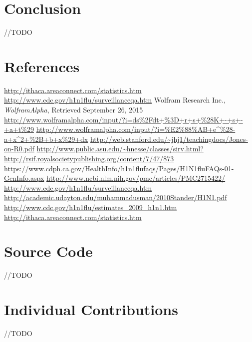 \documentclass[titlepage]{article}
\begin{document}
\section{Conclusion}
	//TODO
\section{References}
	\begin{thebibliography}{9}
		\url{http://ithaca.areaconnect.com/statistics.htm}
		\url{http://www.cdc.gov/h1n1flu/surveillanceqa.htm}
		Wolfram Research Inc.,
		\emph{WolframAlpha},
		Retrieved September 26, 2015
		\url{http://www.wolframalpha.com/input/?i=ds%2Fdt+%3D+r+s+%28K+-+s+-+a+t%29}
		\url{http://www.wolframalpha.com/input/?i=%E2%88%AB+e^%28-a+x^2+%2B+b+x%29+dx}
		\url{http://web.stanford.edu/~jhj1/teachingdocs/Jones-on-R0.pdf}
		\url{http://www.public.asu.edu/~hnesse/classes/sirv.html?}
		\url{http://rsif.royalsocietypublishing.org/content/7/47/873}
		\url{https://www.cdph.ca.gov/HealthInfo/h1n1flufaqs/Pages/H1N1fluFAQs-01-GenInfo.aspx}
		\url{http://www.ncbi.nlm.nih.gov/pmc/articles/PMC2715422/}
		\url{http://www.cdc.gov/h1n1flu/surveillanceqa.htm}
        \url{http://academic.udayton.edu/muhammadusman/2010Stander/H1N1.pdf}
        \url{http://www.cdc.gov/h1n1flu/estimates_2009_h1n1.htm}
        \url{http://ithaca.areaconnect.com/statistics.htm}
	\end{thebibliography}

\section{Source Code}
	//TODO
\section{Individual Contributions}
	//TODO
\end{document}
